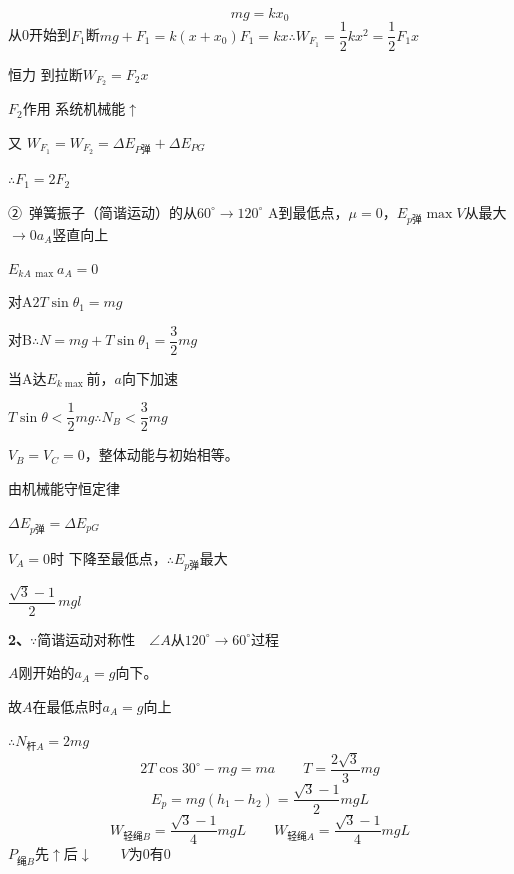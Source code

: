 \begin{problem}
\begin{solution}
\[ mg=kx_0 \]
从0开始到$F_1$断\quad $mg+F_1=k(x+x_0)$\quad $F_1=kx$\quad $\therefore W_{F_1}=\dfrac12kx^2=\dfrac12F_1x$

恒力 到拉断\quad $W_{F_2}=F_2x$

$F_2$作用 系统机械能$\uparrow$

又 $W_{F_1}=W_{F_2}=\Delta E_{P\text{弹}}+\Delta E_{PG}$

$\therefore F_1=2F_2$
\end{solution}
\end{problem}

②\ 弹簧振子（简谐运动）的从$60^\circ\to120^\circ$ A到最低点，$\mu=0$，\quad $E_{p\text{弹}}\max$\quad $V$从最大$\to0$\quad $a_A$竖直向上

$E_{kA\,\max}$\quad $a_A=0$

对A\quad $2T\sin\theta_1=mg$

对B\quad $\therefore N=mg+T\sin\theta_1=\dfrac{3}{2}mg$

当A达$E_{k\max}$前，$a$向下加速

$T\sin\theta<\dfrac{1}{2}mg$\quad $\therefore N_B<\dfrac{3}{2}mg$

$V_B=V_C=0$，整体动能与初始相等。

由机械能守恒定律

$\Delta E_{p\text{弹}}=\Delta E_{pG}$

$V_A=0$时 下降至最低点，$\therefore E_{p\text{弹}}$最大

$\dfrac{\sqrt{3}-1}{2}\,mgl$

\begin{problem}[2]
\textbf{2、}$\because$简谐运动对称性　$\angle A$从$120^\circ\to60^\circ$过程
\begin{solution}
$A$刚开始的$a_A=g$向下。

故$A$在最低点时$a_A=g$向上

$\therefore N_{\text{杆}A}=2mg$
\[ 2T\cos30^\circ-mg=ma\qquad T=\dfrac{2\sqrt{3}}{3}mg \]
\[ E_p=mg(h_1-h_2)=\dfrac{\sqrt{3}-1}{2}mgL \]
\[ W_{\text{轻绳}B}=\dfrac{\sqrt{3}-1}{4}mgL\qquad W_{\text{轻绳}A}=\dfrac{\sqrt{3}-1}{4}mgL \]
$P_{\text{绳}B}$先$\uparrow$后$\downarrow$　　$V$为0有0
\end{solution}
\end{problem}

